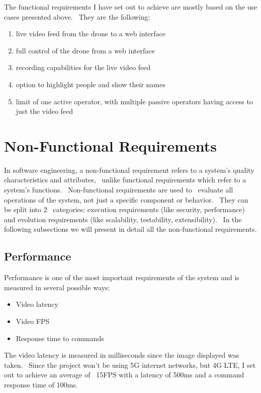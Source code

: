 The functional requirements I have set out to achieve are mostly based on the use cases presented above. \
They are the following:
\begin{enumerate}
    \item live video feed from the drone to a web interface
    \item full control of the drone from a web interface
    \item recording capabilities for the live video feed
    \item option to highlight people and show their names
    \item limit of one active operator, with multiple passive operators having access to just the video feed
\end{enumerate}

\section{Non-Functional Requirements}
\label{sec:non-functional-requirements}

In software engineering, a non-functional requirement refers to a system's quality characteristics and attributes, \
unlike functional requirements which refer to a system's functions. \
Non-functional requirements are used to \
evaluate all operations of the system, not just a specific component or behavior. \
They can be split into 2 \
categories: execution requirements (like security, performance) and evolution requirements (like scalability,
testability, extensibility). \
In the following subsections we will present in detail all the non-functional requirements.

\subsection{Performance}
\label{subsec:specification-performance}
Performance is one of the most important requirements of the system and is measured in several possible ways:
\begin{itemize}
    \item Video latency
    \item Video FPS
    \item Response time to commands
\end{itemize}

The video latency is measured in milliseconds since the image displayed was taken. \
Since the project won't be using 5G internet networks, but 4G LTE, I set out to achieve an average of \
15FPS with a latency of 500ms and a command response time of 100ms.

